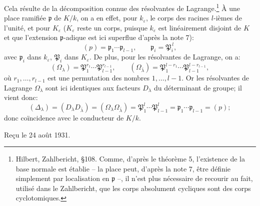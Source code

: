 Cela résulte de la décomposition connue des résolvantes de Lagrange.\footnote{Hilbert, Zahlbericht, \S 108. Comme, d'après le théorème 5, l'existence de la base normale est établie -- la place peut, d'après la note 7, être définie simplement par localisation en \(\mathfrak{p}\) --, il n'est plus nécessaire de recourir au fait, utilisé dans le Zahlbericht, que les corps absolument cycliques sont des corps cyclotomiques.} À une place ramifiée \(\mathfrak{p}\) de \(K/k\), on a en effet, pour \(k_\varepsilon\), le corps des racines \(l\)-ièmes de l'unité, et pour \(K_\varepsilon\) (\(K_\varepsilon\) reste un corps, puisque \(k_\varepsilon\) est linéairement disjoint de \(K\) et que l'extension \(\mathfrak{p}\)-adique est ici superflue d'après la note 7):
\[
        (p)=\mathfrak{p}_1\cdots\mathfrak{p}_{l-1},
        \qquad
        \mathfrak{p}_i=\mathfrak{P}_i^{\,l},
\]
avec \(\mathfrak{p}_i\) dans \(k_\varepsilon\), \(\mathfrak{P}_i\) dans \(K_\varepsilon\). De plus, pour les résolvantes de Lagrange, on a:
\[
        (\Omega_\lambda)=\mathfrak{P}_1^{r_1}\cdots\mathfrak{P}_{l-1}^{r_{l-1}},
        \qquad
        (\Omega_{\bar\lambda})=
        \mathfrak{P}_1^{l-r_1}\cdots\mathfrak{P}_{l-1}^{l-r_{l-1}},
\]
où \(r_1,\ldots,r_{l-1}\) est une permutation des nombres \(1,\ldots,l-1\). Or les résolvantes de Lagrange \(\Omega_\lambda\) sont ici identiques aux facteurs \(D_\lambda\) du déterminant de groupe; il vient donc:
\[
        (\Delta_\lambda)=(D_\lambda D_{\bar\lambda})
        =(\Omega_\lambda\Omega_{\bar\lambda})
        =\mathfrak{P}_1^{l}\cdots\mathfrak{P}_{l-1}^{l}
        =\mathfrak{p}_1\cdots\mathfrak{p}_{l-1}=(p);
\]
donc coïncidence avec le conducteur de \(K/k\).

\begin{center}
Reçu le 24 août 1931.
\end{center}

\setcounter{footnote}{0}
\clearpage
